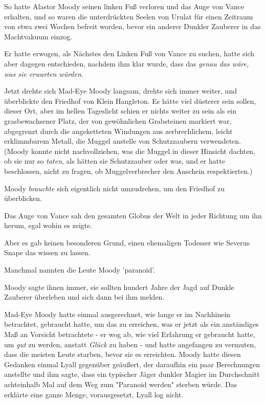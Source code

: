 {So hatte Alastor Moody seinen linken Fuß verloren und das Auge von Vance erhalten, und so waren die unterdrückten Seelen von Urulat für einen Zeitraum von etwa zwei Wochen befreit worden, bevor ein anderer Dunkler Zauberer in das Machtvakuum einzog.

Er hatte erwogen, als Nächstes den Linken Fuß von Vance zu suchen, hatte sich aber dagegen entschieden, nachdem ihm klar wurde, dass das \emph{genau das wäre, was sie erwarten würden}.

Jetzt drehte sich Mad-Eye Moody langsam, drehte sich immer weiter, und überblickte den Friedhof von Klein Hangleton. Es hätte viel düsterer sein sollen, dieser Ort, aber im hellen Tageslicht schien er nichts weiter zu sein als ein grasbewachsener Platz, der von gewöhnlichen Grabsteinen markiert war, abgegrenzt durch die angeketteten Windungen aus zerbrechlichem, leicht erklimmbarem Metall, die Muggel anstelle von Schutzzaubern verwendeten. (Moody konnte nicht nachvollziehen, was die Muggel in dieser Hinsicht dachten, ob sie nur so \emph{taten}, als hätten sie Schutzzauber oder was, und er hatte beschlossen, nicht zu fragen, ob Muggelverbrecher den Anschein respektierten.)

Moody \emph{brauchte} sich eigentlich nicht umzudrehen, um den Friedhof zu überblicken.

Das Auge von Vance sah den gesamten Globus der Welt in jeder Richtung um ihn herum, egal wohin es zeigte.

Aber es gab keinen besonderen Grund, einen ehemaligen Todesser wie Severus Snape das wissen zu lassen.

Manchmal nannten die Leute Moody 'paranoid'.

Moody sagte ihnen immer, sie sollten hundert Jahre der Jagd auf Dunkle Zauberer überleben und sich dann bei ihm melden.

Mad-Eye Moody hatte einmal ausgerechnet, wie lange er im Nachhinein betrachtet, gebraucht hatte, um das zu erreichen, was er jetzt als ein anständiges Maß an Vorsicht betrachtete - er wog ab, wie viel Erfahrung er gebraucht hatte, um \emph{gut} zu werden, anstatt \emph{Glück} zu haben - und hatte angefangen zu vermuten, dass die meisten Leute starben, bevor sie es erreichten. Moody hatte diesen Gedanken einmal Lyall gegenüber geäußert, der daraufhin ein paar Berechnungen anstellte und ihm sagte, dass ein typischer Jäger dunkler Magier im Durchschnitt achteinhalb Mal auf dem Weg zum "Paranoid werden" sterben würde. Das erklärte eine ganze Menge, vorausgesetzt, Lyall log nicht.

}
